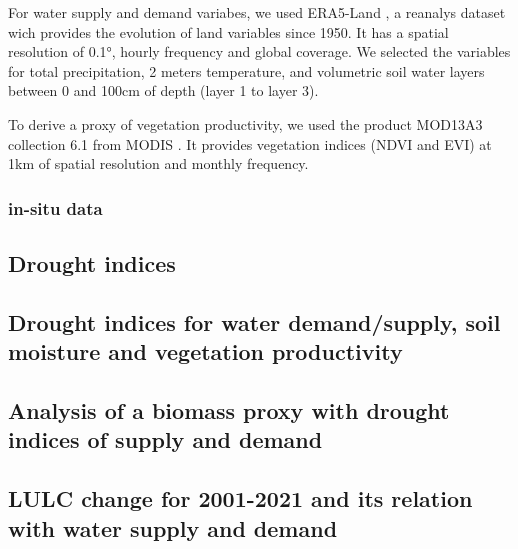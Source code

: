\documentclass[
  number,
  preprint,
  3p]{elsarticle}
\begin{document}
For water supply and demand variabes, we used ERA5-Land
\citep{Munoz2019}, a reanalys dataset wich provides the evolution of
land variables since 1950. It has a spatial resolution of 0.1°, hourly
frequency and global coverage. We selected the variables for total
precipitation, 2 meters temperature, and volumetric soil water layers
between 0 and 100cm of depth (layer 1 to layer 3).

To derive a proxy of vegetation productivity, we used the product
MOD13A3 collection 6.1 from MODIS \citep{Didan2015}. It provides
vegetation indices (NDVI and EVI) at 1km of spatial resolution and
monthly frequency.

\hypertarget{in-situ-data}{%
\subsubsection{in-situ data}\label{in-situ-data}}

\hypertarget{drought-indices}{%
\subsection{Drought indices}\label{drought-indices}}

\hypertarget{section}{%
\subsection{}\label{section}}

\hypertarget{drought-indices-for-water-demandsupply-soil-moisture-and-vegetation-productivity}{%
\subsection{Drought indices for water demand/supply, soil moisture and
vegetation
productivity}\label{drought-indices-for-water-demandsupply-soil-moisture-and-vegetation-productivity}}

\hypertarget{analysis-of-a-biomass-proxy-with-drought-indices-of-supply-and-demand}{%
\subsection{Analysis of a biomass proxy with drought indices of supply
and
demand}\label{analysis-of-a-biomass-proxy-with-drought-indices-of-supply-and-demand}}

\hypertarget{lulc-change-for-2001-2021-and-its-relation-with-water-supply-and-demand}{%
\subsection{LULC change for 2001-2021 and its relation with water supply
and
demand}\label{lulc-change-for-2001-2021-and-its-relation-with-water-supply-and-demand}}
\end{document}
